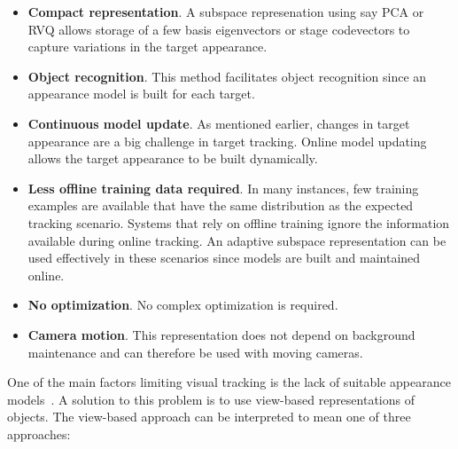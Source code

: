 \begin{Body}
\begin{itemize}
\item \textbf{Compact representation}.  A subspace represenation using say PCA or RVQ allows storage of a few basis eigenvectors or stage codevectors to capture variations in the target appearance.
\item \textbf{Object recognition}.  This method facilitates object recognition since an appearance model is built for each target.
\item \textbf{Continuous model update}.  As mentioned earlier, changes in target appearance are a big challenge in target tracking.  Online model updating allows the target appearance to be built dynamically.
\item \textbf{Less offline training data required}.  In many instances, few training examples are available that have the same distribution as the expected tracking scenario.  Systems that rely on offline training ignore the information available during online tracking.  An adaptive subspace representation can be used effectively in these scenarios since models are built and maintained online.
\item \textbf{No optimization}.  No complex optimization is required.
\item \textbf{Camera motion}.  This representation does not depend on background maintenance and can therefore be used with moving cameras.
\end{itemize}


One of the main factors limiting visual tracking is the lack of suitable appearance models~\cite{2003_JNL_TRKsubspace_Jepson}.  A solution to this problem is to use view-based representations of objects.  The view-based approach can be interpreted to mean one of three approaches:


\end{Body}
